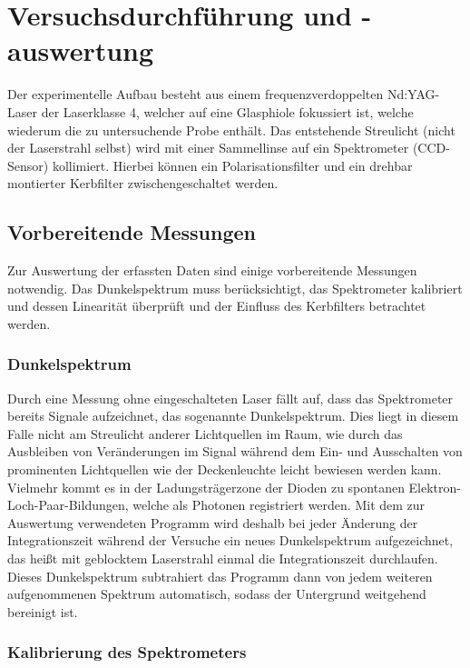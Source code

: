 \documentclass[../bericht.tex]{subfiles}
\begin{document}
  \chapter{Versuchsdurchführung und -auswertung}

    Der experimentelle Aufbau besteht aus einem frequenzverdoppelten Nd:YAG-Laser der Laserklasse 4, welcher auf eine Glasphiole fokussiert ist, welche wiederum die zu untersuchende Probe enthält. Das entstehende Streulicht (nicht der Laserstrahl selbst) wird mit einer Sammellinse auf ein Spektrometer (CCD-Sensor) kollimiert. Hierbei können ein Polarisationsfilter und ein drehbar montierter Kerbfilter zwischengeschaltet werden.


    \section{Vorbereitende Messungen}

      Zur Auswertung der erfassten Daten sind einige vorbereitende Messungen notwendig. Das Dunkelspektrum muss berücksichtigt, das Spektrometer kalibriert und dessen Linearität überprüft und der Einfluss des Kerbfilters betrachtet werden.


      \subsection{Dunkelspektrum}

        Durch eine Messung ohne eingeschalteten Laser fällt auf, dass das Spektrometer bereits Signale aufzeichnet, das sogenannte Dunkelspektrum. Dies liegt in diesem Falle nicht am Streulicht anderer Lichtquellen im Raum, wie durch das Ausbleiben von Veränderungen im Signal während dem Ein- und Ausschalten von prominenten Lichtquellen wie der Deckenleuchte leicht bewiesen werden kann. Vielmehr kommt es in der Ladungsträgerzone der Dioden zu spontanen Elektron-Loch-Paar-Bildungen, welche als Photonen registriert werden. Mit dem zur Auswertung verwendeten Programm wird deshalb bei jeder Änderung der Integrationszeit während der Versuche ein neues Dunkelspektrum aufgezeichnet, das heißt mit geblocktem Laserstrahl einmal die Integrationszeit durchlaufen. Dieses Dunkelspektrum subtrahiert das Programm dann von jedem weiteren aufgenommenen Spektrum automatisch, sodass der Untergrund weitgehend bereinigt ist.


      \subsection{Kalibrierung des Spektrometers}
      \label{subsec:kalibrierung}
\end{document}
